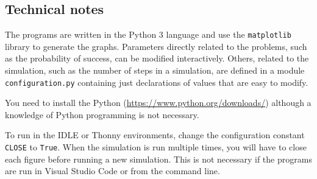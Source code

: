 \subsection*{Technical notes}

The programs are written in the Python 3 language and use the \verb+matplotlib+ library to generate the graphs. Parameters directly related to the problems, such as the probability of success, can be modified interactively. Others, related to the simulation, such as the number of steps in a simulation, are defined in a module \verb+configuration.py+ containing just declarations of values that are easy to modify.

You need to install the Python (\url{https://www.python.org/downloads/}) although a knowledge of Python programming is not necessary.

To run in the IDLE or Thonny environments, change the configuration constant \verb+CLOSE+ to \verb+True+. When the simulation is run multiple times, you will have to close each figure before running a new simulation. This is not necessary if the programs are run in Visual Studio Code or from the command line.
